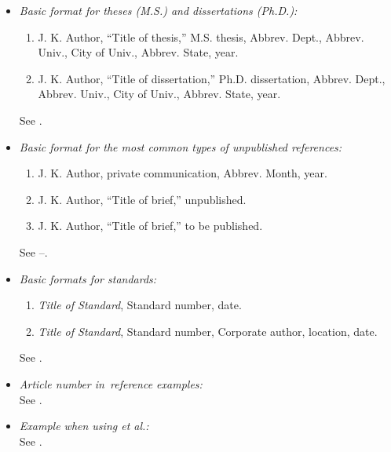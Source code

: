 \documentclass{IEEEtran}
\begin{document}
\begin{itemize}
\item \emph{Basic format for theses (M.S.) and dissertations (Ph.D.):}
\begin{enumerate}
\item J. K. Author, ``Title of thesis,'' M.S. thesis, Abbrev. Dept., Abbrev. Univ., City of Univ., Abbrev. State, year.
\item J. K. Author, ``Title of dissertation,'' Ph.D. dissertation, Abbrev. Dept., Abbrev. Univ., City of Univ., Abbrev. State, year.
\end{enumerate}
See \cite{b25,b26}.

\item \emph{Basic format for the most common types of unpublished references:}
\begin{enumerate}
\item J. K. Author, private communication, Abbrev. Month, year.
\item J. K. Author, ``Title of brief,'' unpublished.
\item J. K. Author, ``Title of brief,'' to be published.
\end{enumerate}
See \cite{b27}--\cite{b29}.

\item \emph{Basic formats for standards:}
\begin{enumerate}
\item \emph{Title of Standard}, Standard number, date.
\item \emph{Title of Standard}, Standard number, Corporate author, location, date.
\end{enumerate}
See \cite{b30,b31}.

\item \emph{Article number in~reference examples:}\\
See \cite{b32,b33}.

\item \emph{Example when using et al.:}\\
See \cite{b34}.

\end{itemize}
\end{document}

